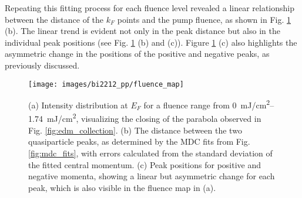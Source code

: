 Repeating this fitting process for each fluence level revealed a linear relationship between the distance of the $k_F$ points and the pump fluence, as shown in Fig. \ref{fig:fluence_map} (b).
The linear trend is evident not only in the peak distance but also in the individual peak positions (see Fig. \ref{fig:fluence_map} (b) and (c)). Figure \ref{fig:fluence_map} (c) also highlights the asymmetric change in the positions of the positive and negative peaks, as previously discussed.

\begin{figure}[th]
	\centering
	\texttt{[image: images/bi2212\_pp/fluence\_map]}
	\caption{(a) Intensity distribution at $E_F$ for a fluence range from \qtyrange{0}{1.74}{\milli\joule/\centi\meter\squared}, visualizing the closing of the parabola observed in Fig. \ref{fig:edm_collection}. (b) The distance between the two quasiparticle peaks, as determined by the MDC fits from Fig. \ref{fig:mdc_fits}, with errors calculated from the standard deviation of the fitted central momentum. (c) Peak positions for positive and negative momenta, showing a linear but asymmetric change for each peak, which is also visible in the fluence map in (a).}
	\label{fig:fluence_map}
\end{figure}

